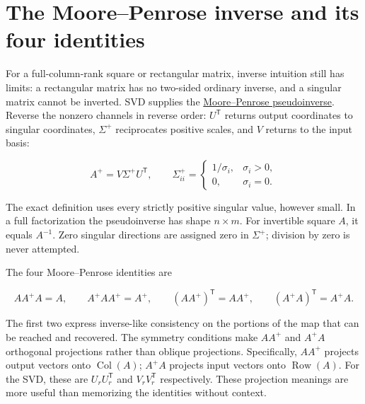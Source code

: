 \section{The Moore--Penrose inverse and its four identities}\label{02-foundations-ii-ch024-the-moorepenrose-inverse-and-its-four-identities}

For a full-column-rank square or rectangular matrix, inverse intuition still has limits: a rectangular matrix has no two-sided ordinary inverse, and a singular matrix cannot be inverted. SVD supplies the \hyperref[02-foundations-ii-ch024-the-moorepenrose-inverse-and-its-four-identities]{Moore--Penrose pseudoinverse}. Reverse the nonzero channels in reverse order: \(U^\mathsf T\) returns output coordinates to singular coordinates, \(\Sigma^+\) reciprocates positive scales, and \(V\) returns to the input basis:

\[
A^+=V\Sigma^+U^\mathsf T,
\qquad
\Sigma^+_{ii}=\begin{cases}1/\sigma_i,&\sigma_i>0,\\0,&\sigma_i=0.\end{cases}
\]

The exact definition uses every strictly positive singular value, however small. In a full factorization the pseudoinverse has shape \(n\times m\). For invertible square \(A\), it equals \(A^{-1}\). Zero singular directions are assigned zero in \(\Sigma^+\); division by zero is never attempted.

The four Moore--Penrose identities are

\[
AA^+A=A,\qquad A^+AA^+=A^+,\qquad (AA^+)^\mathsf T=AA^+,\qquad (A^+A)^\mathsf T=A^+A.
\]

The first two express inverse-like consistency on the portions of the map that can be reached and recovered. The symmetry conditions make \(AA^+\) and \(A^+A\) orthogonal projections rather than oblique projections. Specifically, \(AA^+\) projects output vectors onto \(\operatorname{Col}(A)\); \(A^+A\) projects input vectors onto \(\operatorname{Row}(A)\). For the SVD, these are \(U_rU_r^\mathsf T\) and \(V_rV_r^\mathsf T\) respectively. These projection meanings are more useful than memorizing the identities without context.


